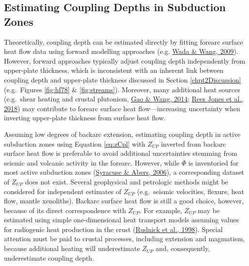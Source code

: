 \hypertarget{estimating-coupling-depths-in-subduction-zones}{%
\subsection{Estimating Coupling Depths in Subduction Zones}\label{estimating-coupling-depths-in-subduction-zones}}

Theoretically, coupling depth can be estimated directly by fitting forearc surface heat flow data using forward modelling approaches (e.g. \protect\hyperlink{ref-wada2009}{Wada \& Wang, 2009}). However, forward approaches typically adjust coupling depth independently from upper-plate thickness, which is inconsistent with an inherent link between coupling depth and upper-plate thickness discussed in Section \ref{chpt2Discussion} (e.g.~Figures \ref{fig:hf78} \& \ref{fig:streams}). Moreover, many additional heat sources (e.g.~shear heating and crustal plutonism, \protect\hyperlink{ref-gao2014}{Gao \& Wang, 2014}; \protect\hyperlink{ref-reesjones2018}{Rees Jones et al., 2018}) may contribute to forearc surface heat flow---increasing uncertainty when inverting upper-plate thickness from surface heat flow.

Assuming low degrees of backarc extension, estimating coupling depth in active subduction zones using Equation \eqref{eq:zCpl} with \(Z_{UP}\) inverted from backarc surface heat flow is preferable to avoid additional uncertainties stemming from seismic and volcanic activity in the forearc. However, while \(\Phi\) is inventoried for most active subduction zones (\protect\hyperlink{ref-syracuse2006}{Syracuse \& Abers, 2006}), a corresponding dataset of \(Z_{UP}\) does not exist. Several geophysical and petrologic methods might be considered for independent estimates of \(Z_{UP}\) (e.g.~seismic velocities, flexure, heat flow, mantle xenoliths). Backarc surface heat flow is still a good choice, however, because of its direct correspondence with \(Z_{UP}\). For example, \(Z_{UP}\) may be estimated using simple one-dimensional heat transport models assuming values for radiogenic heat production in the crust (\protect\hyperlink{ref-rudnick1998}{Rudnick et al., 1998}). Special attention must be paid to crustal processes, including extension and magmatism, because additional heating will underestimate \(Z_{UP}\) and, consequently, underestimate coupling depth.

